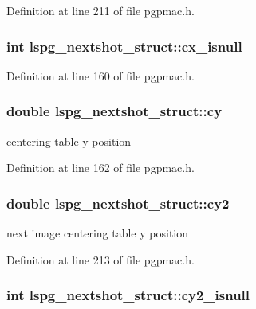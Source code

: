 Definition at line 211 of file pgpmac.h.\hypertarget{structlspg__nextshot__struct_a779b99533f0ed4e659177afb0b791ad2}{
\subsubsection[{cx\_\-isnull}]{\setlength{\rightskip}{0pt plus 5cm}int {\bf lspg\_\-nextshot\_\-struct::cx\_\-isnull}}}
\label{structlspg__nextshot__struct_a779b99533f0ed4e659177afb0b791ad2}


Definition at line 160 of file pgpmac.h.\hypertarget{structlspg__nextshot__struct_ab7a7b37a17f06c4e9ebdcdf056946098}{
\subsubsection[{cy}]{\setlength{\rightskip}{0pt plus 5cm}double {\bf lspg\_\-nextshot\_\-struct::cy}}}
\label{structlspg__nextshot__struct_ab7a7b37a17f06c4e9ebdcdf056946098}


centering table y position 

Definition at line 162 of file pgpmac.h.\hypertarget{structlspg__nextshot__struct_a3644e5c3f12af18a3b426d4d4d7e16a5}{
\subsubsection[{cy2}]{\setlength{\rightskip}{0pt plus 5cm}double {\bf lspg\_\-nextshot\_\-struct::cy2}}}
\label{structlspg__nextshot__struct_a3644e5c3f12af18a3b426d4d4d7e16a5}


next image centering table y position 

Definition at line 213 of file pgpmac.h.\hypertarget{structlspg__nextshot__struct_a57d78a389413827302df6ebe3dcb3c89}{
\subsubsection[{cy2\_\-isnull}]{\setlength{\rightskip}{0pt plus 5cm}int {\bf lspg\_\-nextshot\_\-struct::cy2\_\-isnull}}}
\label{structlspg__nextshot__struct_a57d78a389413827302df6ebe3dcb3c89}


